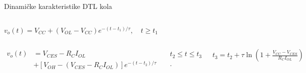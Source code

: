 \begin{frame}[label=10-s049]{Dinamičke karakteristike DTL kola}
\setlength{\abovedisplayskip}{4pt}\setlength{\belowdisplayskip}{4pt}\setlength{\abovedisplayshortskip}{3pt}\setlength{\belowdisplayshortskip}{3pt}
\begin{columns}[T,onlytextwidth]\centering
{}\centering\par\smallskip
\(\displaystyle v_o(t)=V_{CC}+(V_{OL}-V_{CC})e^{-(t-t_1)/\tau},\quad t\geq t_1\)
\end{columns}\smallskip
\begin{columns}[T,onlytextwidth]\centering
{}\centering
\(\displaystyle\begin{aligned}v_o(t)&=V_{CES}-R_CI_{OL}\\&+[V_{OH}-(V_{CES}-R_CI_{OL})]e^{-(t-t_2)/\tau}\end{aligned}\)\par\smallskip
$t_2\leq t\leq t_3$.\par\smallskip
\(\displaystyle t_3=t_2+\tau\ln\left(1+\frac{V_{CC}-V_{CES}}{R_CI_{OL}}\right)\)
\end{columns}
\end{frame}
